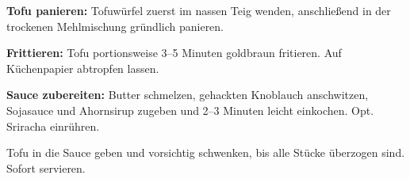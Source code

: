 \begin{recipe}
{    \step%
    \textbf{Tofu panieren:} Tofuwürfel zuerst im nassen Teig wenden, anschließend in der trockenen Mehlmischung gründlich panieren.
    
    \step%
    \textbf{Frittieren:} Tofu portionsweise 3--5 Minuten goldbraun fritieren. Auf Küchenpapier abtropfen lassen.
    
    \step%
    \textbf{Sauce zubereiten:} Butter schmelzen, gehackten Knoblauch anschwitzen, Sojasauce und Ahornsirup zugeben und 2--3 Minuten leicht einkochen. Opt. Sriracha einrühren.
    
    \step%
    Tofu in die Sauce geben und vorsichtig schwenken, bis alle Stücke überzogen sind. Sofort servieren.
}


\end{recipe}